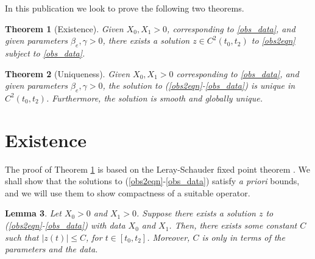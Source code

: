 \documentclass{article}
\newtheorem{thm}{Theorem}
\newtheorem{lem}[thm]{Lemma}
\newcommand{\obss}{(\ref{obs2eqn}-\ref{obs_data}) }
\begin{document}
In this publication we look to prove the following two theorems.
\begin{thm}[Existence] \label{thm:existence}
    Given $X_0,X_1>0$, corresponding to \eqref{obs_data}, and given parameters $\beta_e,\gamma > 0$, there exists a solution $z\in C^2(t_0,t_2)$ to \eqref{obs2eqn} subject to \eqref{obs_data}. 
\end{thm}
%
\begin{thm}[Uniqueness] \label{thm:uniqueness}
    Given $X_0, X_1 > 0$ corresponding to \eqref{obs_data}, and given parameters $\beta_e,\gamma > 0$, the solution to \obss is unique in $C^2(t_0,t_2)$. Furthermore, the solution is smooth and globally unique.
\end{thm}

\section{Existence}
\label{existence}

The proof of Theorem \ref{thm:existence} is based on the Leray-Schauder fixed point theorem \cite{H08}. We shall show that the solutions to \obss satisfy \textit{a priori} bounds, and we will use them to show compactness of a suitable operator.

\begin{lem} \label{zbound_0}
Let $X_0>0$ and $X_1>0$. Suppose there exists a solution $z$ to \obss with data $X_0$ and $X_1$. Then, there exists some constant $C$ such that $|z(t)| \leq C$, for $t \in [t_0,t_2]$. Moreover, $C$ is only in terms of the parameters and the data.
\end{lem}
\end{document}
